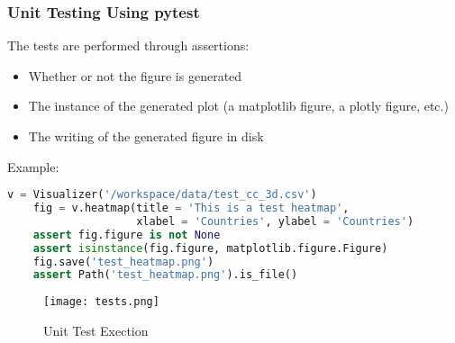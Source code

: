 \begin{frame}[fragile,shrink=30]
  \frametitle{Unit Testing Using pytest}
  

  The tests are performed through assertions:
  \begin{itemize}
    \item Whether or not the figure is generated
    \item The instance of the generated plot (a matplotlib figure, a plotly figure, etc.) 
    \item The writing of the generated figure in disk
  \end{itemize}

  \vspace{5mm}

  Example:
  \begin{lstlisting}[language=Python]
    v = Visualizer('/workspace/data/test_cc_3d.csv')
    fig = v.heatmap(title = 'This is a test heatmap',
                    xlabel = 'Countries', ylabel = 'Countries')
    assert fig.figure is not None
    assert isinstance(fig.figure, matplotlib.figure.Figure)
    fig.save('test_heatmap.png')
    assert Path('test_heatmap.png').is_file()
  \end{lstlisting}

  \begin{figure}[h]
    \centering
    \texttt{[image: tests.png]}
    \caption{Unit Test Exection}
    \label{fig:tests}
  \end{figure}
  

\end{frame}
